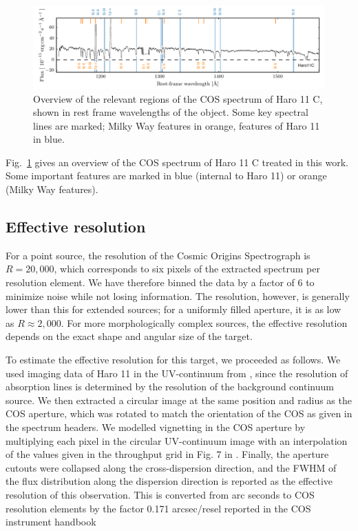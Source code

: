 \documentclass[twocolumn,]{aastex61}
\begin{document}
\begin{figure}
\centering
\includegraphics[]{../Figs/FullSpec.pdf}
\caption{Overview of the relevant regions of the COS spectrum of Haro 11
C, shown in rest frame wavelengths of the object. Some key spectral
lines are marked; Milky Way features in orange, features of Haro 11 in
blue.}\label{fig:fullspec}
\end{figure}

Fig.~\ref{fig:fullspec} gives an overview of the COS spectrum of Haro 11
C treated in this work. Some important features are marked in blue
(internal to Haro 11) or orange (Milky Way features).


\subsection{Effective resolution}\label{effective-resolution}

For a point source, the resolution of the Cosmic Origins Spectrograph is
$R=20,000$, which corresponds to six pixels of the extracted spectrum
per resolution element. We have therefore binned the data by a factor of
6 to minimize noise while not losing information. The resolution,
however, is generally lower than this for extended sources; for a
uniformly filled aperture, it is as low as $R\approx2,000$. For more
morphologically complex sources, the effective resolution depends on the
exact shape and angular size of the target.

To estimate the effective resolution for this target, we proceeded as
follows. We used imaging data of Haro 11 in the UV-continuum
from \citet{Ostlin2009, Hayes2009}, since the resolution of absorption
lines is determined by the resolution of the background continuum source. We 
then extracted a circular image at the same
position and radius as the COS aperture, which was rotated to match the
orientation of the COS as given in the spectrum headers. We modelled
vignetting in the COS aperture by multiplying each pixel in the circular
UV-continuum image with an interpolation of the values given in the
throughput grid in Fig. 7 in \citet{CosImaging}. Finally, the aperture
cutouts were collapsed along the cross-dispersion direction, and the
FWHM of the flux distribution along the dispersion direction is reported
as the effective resolution of this observation. This is converted from
arc seconds to COS resolution elements by the factor 0.171 arcsec/resel
reported in the COS instrument handbook \citep{CosHandbook}
\end{document}
